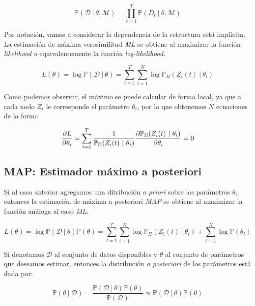 \begin{equation*}
\mathbb{P}(\mathcal{D}\ |\ \theta ,\mathcal{M})=\prod\limits_{t=1}^{T}%
\mathbb{P}(D_{t}\ |\ \theta ,\mathcal{M})
\end{equation*}

Por notación, vamos a considerar la dependencia de la estructura está implícita. La estimación de máxima verosimilitud \emph{ML} se obtiene al maximizar la función \emph{likelihood} o equivalentemente la función \emph{log-likelihood:}

\begin{equation*}
L(\theta )=\log \mathbb{P}(\mathcal{D}\ |\ \theta
)=\sum\limits_{t=1}^{T}\sum\limits_{i=1}^{N}\log \mathbb{P}_{\Pi }(Z_{i}(t)\
|\ \theta _{i})
\end{equation*}

Como podemos observar, el máximo se puede calcular de forma local, ya que a cada nodo $Z_{i}$ le corresponde el parámetro $\theta _{i}$, por lo que obtenemos $N$ ecuaciones de la forma

\begin{equation*}
\frac{\partial L}{\partial \theta _{i}}=\sum\limits_{t=1}^{T}\frac{1}{%
	\mathbb{P}_{\Pi }(Z_{i}(t)\ |\ \theta _{i})}\frac{\partial \mathbb{P}_{\Pi
	}(Z_{i}(t)\ |\ \theta _{i})}{\partial \theta _{i}}=0
\end{equation*}



\subsection{MAP: Estimador máximo a posteriori}

Si al caso anterior agregamos una ditribución \emph{a priori} sobre los parámetros $\theta $, entonces la estimación de máxima a posteriori \emph{MAP} se obtiene al maximizar la función análoga al caso \emph{ML}:

\begin{equation*}
L(\theta )=\log \mathbb{P}(\mathcal{D}\ |\ \theta )\mathbb{P}(\theta
)=\sum\limits_{t=1}^{T}\sum\limits_{i=1}^{N}\log \mathbb{P}_{\Pi }(Z_{i}(t)\
|\ \theta _{i})+\sum\limits_{i=1}^{N}\log \mathbb{P}(\theta _{i})
\end{equation*}


Si denotamos $\mathcal{D}$ al conjunto de datos disponibles y $\theta $ al conjunto de parámetros que deseamos estimar, entonces la distribución \emph{a posteriori} de los parámetros está dada por:

\begin{equation*}
\mathbb{P}(\theta \ |\ \mathcal{D})=\frac{\mathbb{P}(\mathcal{D}\ |\ \theta )%
	\mathbb{P}(\theta )}{\mathbb{P}(\mathcal{D})}\varpropto \mathbb{P}(\mathcal{D%
}\ |\ \theta )\mathbb{P}(\theta )
\end{equation*}

